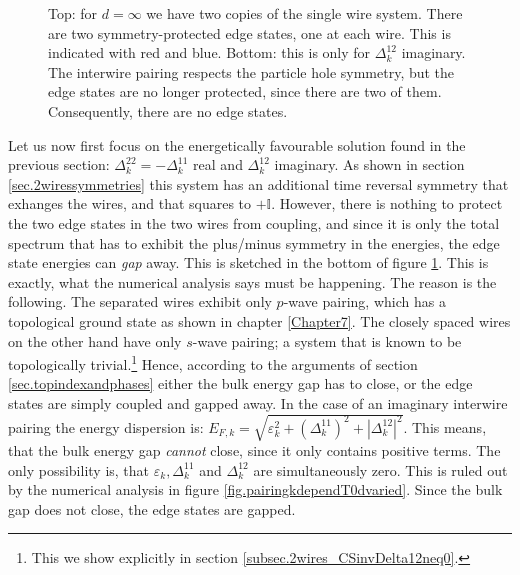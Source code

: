 \begin{figure}
\caption{Top: for $d=\infty$ we have two copies of the single wire system. There are two symmetry-protected edge states, one at each wire. This is indicated with red and blue. Bottom: this is only for $\Delta^{12}_k$ imaginary. The interwire pairing respects the particle hole symmetry, but the edge states are no longer protected, since there are two of them. Consequently, there are no edge states.}
\label{fig.2wiresedgestates}
\end{figure}

Let us now first focus on the energetically favourable solution found in the previous section: $\Delta^{22}_k = - \Delta^{11}_k$ real and $\Delta^{12}_k$ imaginary. As shown in section \ref{sec.2wiressymmetries} this system has an additional time reversal symmetry that exhanges the wires, and that squares to $+\mathbb{I}$. However, there is nothing to protect the two edge states in the two wires from coupling, and since it is only the total spectrum that has to exhibit the plus/minus symmetry in the energies, the edge state energies can \textit{gap} away. This is sketched in the bottom of figure \ref{fig.2wiresedgestates}. This is exactly, what the numerical analysis says must be happening. The reason is the following. The separated wires exhibit only $p$-wave pairing, which has a topological ground state as shown in chapter \ref{Chapter7}. The closely spaced wires on the other hand have only $s$-wave pairing; a system that is known to be topologically trivial.\footnote{This we show explicitly in section \ref{subsec.2wires_CSinvDelta12neq0}.} Hence, according to the arguments of section \ref{sec.topindexandphases} either the bulk energy gap has to close, or the edge states are simply coupled and gapped away. In the case of an imaginary interwire pairing the energy dispersion is: $E_{F,k} = \sqrt{\varepsilon^2_k + (\Delta^{11}_k)^2 + |\Delta^{12}_k|^2 }$. This means, that the bulk energy gap \textit{cannot} close, since it only contains positive terms. The only possibility is, that $\varepsilon_k, \Delta^{11}_k$ and $\Delta^{12}_k$ are simultaneously zero. This is ruled out by the numerical analysis in figure \ref{fig.pairingkdependT0dvaried}. Since the bulk gap does not close, the edge states are gapped.

